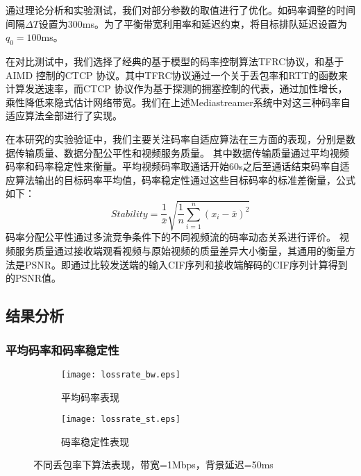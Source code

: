     通过理论分析和实验测试，我们对部分参数的取值进行了优化。如码率调整的时间间隔$\Delta T$设置为300ms。为了平衡带宽利用率和延迟约束，将目标排队延迟设置为$q_0 = 100$ms。

    在对比测试中，我们选择了经典的基于模型的码率控制算法TFRC协议，和基于AIMD 控制的CTCP \cite{song2006compound} 协议。其中TFRC协议通过一个关于丢包率和RTT的函数来计算发送速率，而CTCP 协议作为基于探测的拥塞控制的代表，通过加性增长，乘性降低来隐式估计网络带宽。我们在上述Mediastreamer系统中对这三种码率自适应算法全部进行了实现。

    在本研究的实验验证中，我们主要关注码率自适应算法在三方面的表现，分别是数据传输质量、数据分配公平性和视频服务质量。
    其中数据传输质量通过平均视频码率和码率稳定性来衡量。平均视频码率取通话开始60s之后至通话结束码率自适应算法输出的目标码率平均值，码率稳定性通过这些目标码率的标准差衡量，公式如下：
    \begin{displaymath} \label{eq:throughput}
    Stability = \frac{1}{\bar{x}}\sqrt{ \frac{1}{n} \sum_{i=1}^{n}(x_i-\bar{x})^2 }
    \end{displaymath}
    码率分配公平性通过多流竞争条件下的不同视频流的码率动态关系进行评价。
    视频服务质量通过接收端观看视频与原始视频的质量差异大小衡量，其通用的衡量方法是PSNR。即通过比较发送端的输入CIF序列和接收端解码的CIF序列计算得到的PSNR值。

    \subsection{结果分析}

        \subsubsection{平均码率和码率稳定性}

        \begin{figure}[htbp]
          \begin{subfigure}[b]{0.5\textwidth}
            \centering
            \texttt{[image: lossrate\_bw.eps]}
            \caption{平均码率表现}
            \label{pic:lossrate_bw}
          \end{subfigure}
          \begin{subfigure}[b]{0.5\textwidth}
            \centering
            \texttt{[image: lossrate\_st.eps]}
            \caption{码率稳定性表现}
            \label{pic:lossrate_st}
          \end{subfigure}
          \caption{不同丢包率下算法表现，带宽=1Mbps，背景延迟=50ms}
          \label{pic:lossrate}
        \end{figure}

